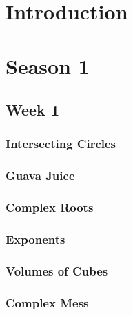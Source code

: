 \documentclass[titlepage=true]{scrartcl}
\begin{document}
\SSfp

\section*{Introduction} 

\newpage
{}
\section{Season 1}

    \subsection{Week 1}
        
        \subsubsection{Intersecting Circles}
            \label{1-1-1}
            
        \newpage

        \subsubsection{Guava Juice}
            \label{1-1-2}
            
        \newpage 

        \subsubsection{Complex Roots}
            \label{1-1-3}
            
        \newpage 

        \subsubsection{Exponents}
            \label{1-1-4}
            
        \newpage

        \subsubsection{Volumes of Cubes}
            \label{1-1-5}
            
        \newpage

        \subsubsection{Complex Mess}
            \label{1-1-6}
            
        \newpage 
\end{document}
